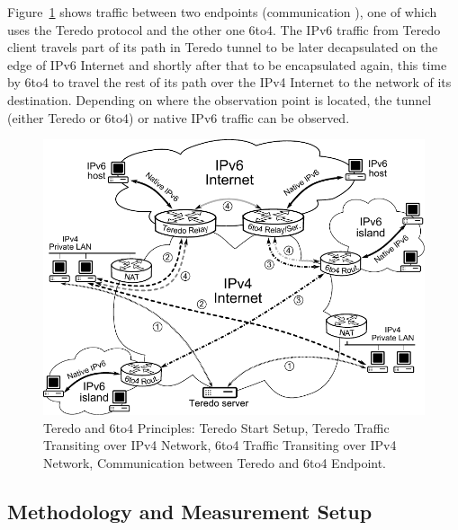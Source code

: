 Figure~\ref{fig:ipv6-tunnels-monitoring-schema} shows traffic between two endpoints (communication ), one of which uses the Teredo protocol and the other one 6to4. The IPv6 traffic from Teredo client travels part of its path in Teredo tunnel to be later decapsulated on the edge of IPv6 Internet and shortly after that to be encapsulated again, this time by 6to4 to travel the rest of its path over the IPv4 Internet to the network of its destination. Depending on where the observation point is located, the tunnel (either Teredo or 6to4) or native IPv6 traffic can be observed.

\begin{figure}[!tb]
        \centering
        \includegraphics{figures/paper-tunnels/tunely-schema}
        \caption{Teredo and 6to4 Principles:  Teredo Start Setup,  Teredo Traffic Transiting over IPv4 Network,  6to4 Traffic Transiting over IPv4 Network,  Communication between Teredo and 6to4 Endpoint.}
        \label{fig:ipv6-tunnels-monitoring-schema}
\end{figure}


\subsection{Methodology and Measurement Setup} \label{subsec:ipv6-tunnels-met-mon-setup}

